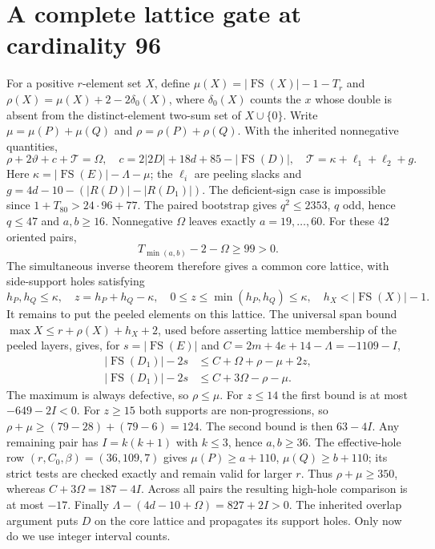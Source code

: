 \documentclass[11pt,a4paper]{article}
\newcommand{\FS}{\operatorname{FS}}
\newcommand{\T}{\mathcal T}
\begin{document}
\section{A complete lattice gate at cardinality 96}
For a positive $r$-element set $X$, define
$\mu(X)=|\FS(X)|-1-T_r$ and
$\rho(X)=\mu(X)+2-2\delta_0(X)$, where $\delta_0(X)$ counts the $x$
whose double is absent from the distinct-element two-sum set of
$X\cup\{0\}$. Write $\mu=\mu(P)+\mu(Q)$ and
$\rho=\rho(P)+\rho(Q)$. With the inherited nonnegative quantities,
\begin{equation}\label{budget}
 \rho+2\vartheta+c+\T=\Omega,\quad
 c=2|2D|+18d+85-|\FS(D)|,\quad
 \T=\kappa+\ell_1+\ell_2+g.
\end{equation}
Here $\kappa=|\FS(E)|-\Lambda-\mu$; the $\ell_i$ are peeling slacks and
$g=4d-10-(|R(D)|-|R(D_1)|)$.
The deficient-sign case is impossible since
$1+T_{80}>24\cdot96+77$. The paired bootstrap gives $q^2\le2353$,
$q$ odd, hence $q\le47$ and $a,b\ge16$. Nonnegative $\Omega$ leaves
exactly $a=19,\ldots,60$. For these 42 oriented pairs,
\[
 T_{\min(a,b)}-2-\Omega\ge99>0.
\]
The simultaneous inverse theorem therefore gives a common core lattice,
with side-support holes satisfying
\[
 h_P,h_Q\le\kappa,\quad z=h_P+h_Q-\kappa,\quad
 0\le z\le\min(h_P,h_Q)\le\kappa,\quad h_X<|\FS(X)|-1.
\]
It remains to put the peeled elements on this lattice. The universal
span bound $\max X\le r+\rho(X)+h_X+2$, used before asserting lattice
membership of the peeled layers, gives, for $s=|\FS(E)|$ and
$C=2m+4e+14-\Lambda=-1109-I$,
\begin{align*}
 |\FS(D_1)|-2s&\le C+\Omega+\rho-\mu+2z,\\
 |\FS(D_1)|-2s&\le C+3\Omega-\rho-\mu.
\end{align*}
The maximum is always defective, so $\rho\le\mu$. For $z\le14$ the
first bound is at most $-649-2I<0$. For $z\ge15$ both supports are
non-progressions, so $\rho+\mu\ge(79-28)+(79-6)=124$.
The second bound is then $63-4I$. Any remaining pair has
$I=k(k+1)$ with $k\le3$, hence $a,b\ge36$.
The effective-hole row $(r,C_0,\beta)=(36,109,7)$ gives
$\mu(P)\ge a+110$, $\mu(Q)\ge b+110$; its strict tests are checked
exactly and remain valid for larger $r$. Thus $\rho+\mu\ge350$,
whereas $C+3\Omega=187-4I$. Across all pairs the resulting high-hole
comparison is at most $-17$.
Finally
$\Lambda-(4d-10+\Omega)=827+2I>0$.
The inherited overlap argument puts $D$ on the core lattice and
propagates its support holes. Only now do we use integer interval counts.
\end{document}
